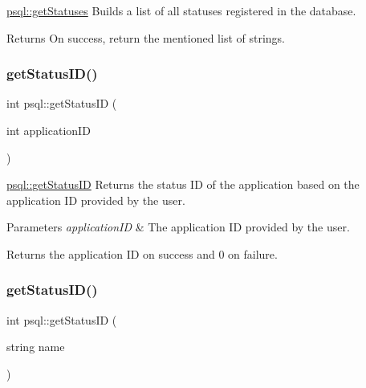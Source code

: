 \mbox{\hyperlink{classpsql_a14854d28aabc7e658aea87a7b8b52e5c}{psql\+::get\+Statuses}} Builds a list of all statuses registered in the database. 

\begin{DoxyReturn}{Returns}
On success, return the mentioned list of strings. 
\end{DoxyReturn}
\mbox{\label{classpsql_a9c02c92c09cb60c35d24375673b7df06}} 
\subsubsection{\texorpdfstring{get\+Status\+I\+D()}{getStatusID()}\hspace{0.1cm}{\footnotesize\ttfamily [1/2]}}
{\footnotesize\ttfamily int psql\+::get\+Status\+ID (\begin{DoxyParamCaption}\item[{int}]{application\+ID }\end{DoxyParamCaption})}



\mbox{\hyperlink{classpsql_a9c02c92c09cb60c35d24375673b7df06}{psql\+::get\+Status\+ID}} Returns the status ID of the application based on the application ID provided by the user. 


\begin{DoxyParams}{Parameters}
{\em application\+ID} & The application ID provided by the user. \\
\hline
\end{DoxyParams}
\begin{DoxyReturn}{Returns}
the application ID on success and 0 on failure. 
\end{DoxyReturn}
\mbox{\label{classpsql_a9d13aebcb6d151719769207238865e75}} 
\subsubsection{\texorpdfstring{get\+Status\+I\+D()}{getStatusID()}\hspace{0.1cm}{\footnotesize\ttfamily [2/2]}}
{\footnotesize\ttfamily int psql\+::get\+Status\+ID (\begin{DoxyParamCaption}\item[{string}]{name }\end{DoxyParamCaption})}



